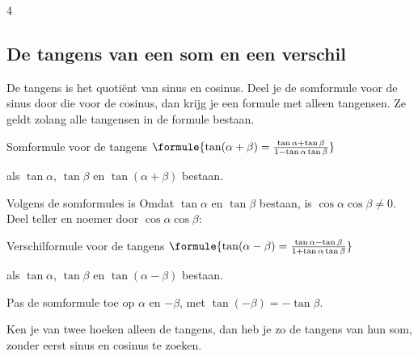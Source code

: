 \begin{alleenvoor}{4}
\subsection{De tangens van een som en een verschil}

De tangens is het quotiënt van sinus en cosinus. Deel je de somformule voor de sinus door die voor de cosinus, dan krijg je een formule met alleen tangensen. Ze geldt zolang alle tangensen in de formule bestaan.

\begin{theorie}
\begin{stelling}{Somformule voor de tangens}
\qquad $\formule{\tan(\alpha + \beta) = \frac{\tan\alpha + \tan\beta}{1 - \tan\alpha\tan\beta}}$

\vspace{1mm}
als $\tan\alpha$, $\tan\beta$ en $\tan(\alpha + \beta)$ bestaan.
\end{stelling}
\begin{bewijs}
Volgens de somformules is
Omdat $\tan\alpha$ en $\tan\beta$ bestaan, is $\cos\alpha\cos\beta \neq 0$. Deel teller en noemer door $\cos\alpha\cos\beta$:
\end{bewijs}
\begin{stelling}{Verschilformule voor de tangens}
\qquad $\formule{\tan(\alpha - \beta) = \frac{\tan\alpha - \tan\beta}{1 + \tan\alpha\tan\beta}}$

\vspace{1mm}
als $\tan\alpha$, $\tan\beta$ en $\tan(\alpha - \beta)$ bestaan.
\end{stelling}
\begin{bewijs}
Pas de somformule toe op $\alpha$ en $-\beta$, met $\tan(-\beta) = -\tan\beta$.
\end{bewijs}
\end{theorie}

Ken je van twee hoeken alleen de tangens, dan heb je zo de tangens van hun som, zonder eerst sinus en cosinus te zoeken.


\end{alleenvoor}
